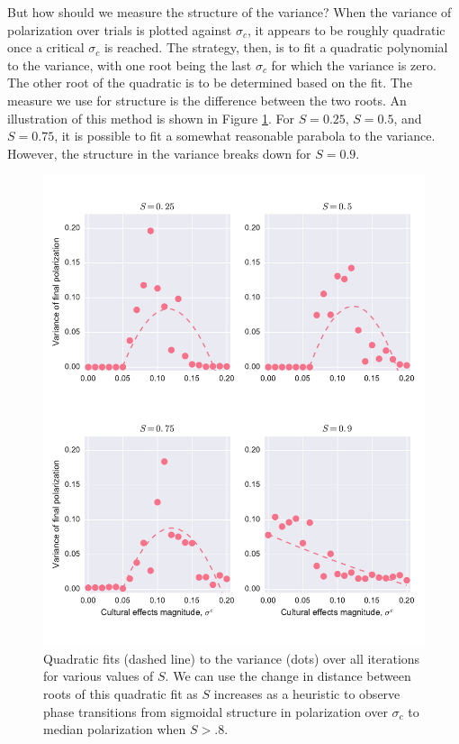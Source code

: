 \documentclass[11pt,letterpaper]{article}
\newcommand{\sigc}{\ensuremath{\sigma_c}}
\begin{document}
But how should we measure the structure of the variance? When the variance
of polarization over trials is plotted against $\sigc$, it appears to be
roughly quadratic once a critical $\sigc$ is reached. The strategy, then, is
to fit a quadratic polynomial to the variance, with one root being the last
$\sigc$ for which the variance is zero. The other root of the quadratic is
to be determined based on the fit. The measure we use for structure is the
difference between the two roots. An illustration of this method is shown in
Figure \ref{fig:quadfits}. For $S=0.25$, $S=0.5$, and $S=0.75$, it is possible
to fit a somewhat reasonable parabola to the variance. However, the structure
in the variance breaks down for $S=0.9$. 

\begin{figure}[h!]
  \centering
  \includegraphics[width=\textwidth]{figures/quad-fits.pdf}
  \caption{Quadratic fits (dashed line) to the variance (dots) over all iterations for 
  various values of $S$. We can use the change in distance between roots of this
  quadratic fit as $S$ increases as a heuristic to observe phase transitions
  from sigmoidal structure in polarization over $\sigc$ to median polarization
  when $S > .8$.}
  \label{fig:quadfits}
\end{figure}
\end{document}
